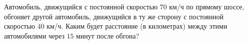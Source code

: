 \begin{ex}
	\begin{condition}
		Автомобиль, движущийся с постоянной скоростью \( 70  \) км/ч по прямому шоссе, обгоняет другой автомобиль, движущийся в ту же сторону с постоянной скоростью \( 40  \) км/ч. Каким будет расстояние (в километрах) между этими автомобилями через \( 15  \) минут после обгона?
	\end{condition}
\end{ex}